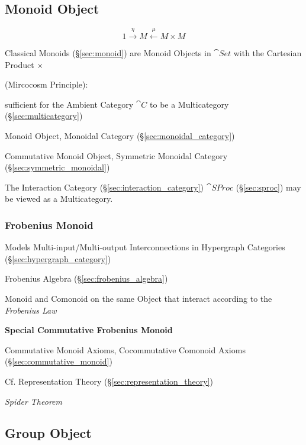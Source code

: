 \subsection{Monoid Object}\label{sec:monoid_object}

\[
  1 \xrightarrow{\eta} M \xleftarrow{\mu} M \times M
\]

Classical Monoids (\S\ref{sec:monoid}) are Monoid Objects in
$\cat{Set}$ with the Cartesian Product $\times$

(Mircocosm Principle): %

sufficient for the Ambient Category $\cat{C}$ to be a Multicategory
(\S\ref{sec:multicategory})

Monoid Object, Monoidal Category (\S\ref{sec:monoidal_category})

Commutative Monoid Object, Symmetric Monoidal Category
(\S\ref{sec:symmetric_monoidal})

The Interaction Category (\S\ref{sec:interaction_category})
$\cat{SProc}$ (\S\ref{sec:sproc}) may be viewed as a Multicategory.



\subsubsection{Frobenius Monoid}\label{sec:frobenius_monoid}

Models Multi-input/Multi-output Interconnections in Hypergraph
Categories (\S\ref{sec:hypergraph_category})

\fist Frobenius Algebra (\S\ref{sec:frobenius_algebra})

Monoid and Comonoid on the same Object that interact according to the
\emph{Frobenius Law}


\textbf{Special Commutative Frobenius Monoid}

Commutative Monoid Axioms, Cocommutative Comonoid Axioms
(\S\ref{sec:commutative_monoid})

\fist Cf. Representation Theory (\S\ref{sec:representation_theory})

\emph{Spider Theorem}



\subsection{Group Object}\label{sec:group_object}

